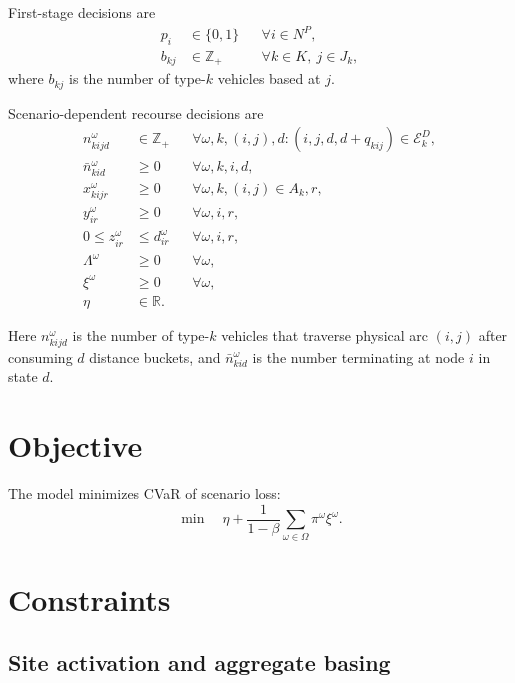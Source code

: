 \documentclass[11pt]{article}
\newcommand{\R}{\mathbb{R}}
\newcommand{\Z}{\mathbb{Z}}
\begin{document}
First-stage decisions are
\begin{align}
p_i &\in\{0,1\}
&&\forall i\in N^P,
\label{eq:domain-p}\\
b_{kj} &\in\Z_+
&&\forall k\in K,\ j\in J_k,
\label{eq:domain-b}
\end{align}
where $b_{kj}$ is the number of type-$k$ vehicles based at $j$.

Scenario-dependent recourse decisions are
\begin{align}
n^\omega_{kijd} &\in\Z_+
&&\forall \omega,k,(i,j),d:
(i,j,d,d+q_{kij})\in\mathcal E_k^D,
\label{eq:domain-n}\\
\bar n^\omega_{kid} &\geq0
&&\forall\omega,k,i,d,
\label{eq:domain-nbar}\\
x^\omega_{kijr} &\geq0
&&\forall\omega,k,(i,j)\in A_k,r,
\label{eq:domain-x}\\
y^\omega_{ir} &\geq0
&&\forall\omega,i,r,
\label{eq:domain-y}\\
0\leq z^\omega_{ir} &\leq d^\omega_{ir}
&&\forall\omega,i,r,
\label{eq:domain-z}\\
\Lambda^\omega &\geq0
&&\forall\omega,
\label{eq:domain-loss}\\
\xi^\omega &\geq0
&&\forall\omega,
\label{eq:domain-xi}\\
\eta &\in\R.
\label{eq:domain-eta}
\end{align}

Here $n^\omega_{kijd}$ is the number of type-$k$ vehicles that traverse
physical arc $(i,j)$ after consuming $d$ distance buckets, and
$\bar n^\omega_{kid}$ is the number terminating at node $i$ in state $d$.

\section{Objective}

The model minimizes CVaR of scenario loss:
\begin{equation}
\min\quad
\eta+
\frac{1}{1-\beta}
\sum_{\omega\in\Omega}\pi^\omega\xi^\omega.
\label{eq:objective}
\end{equation}

\section{Constraints}

\subsection{Site activation and aggregate basing}
\end{document}

